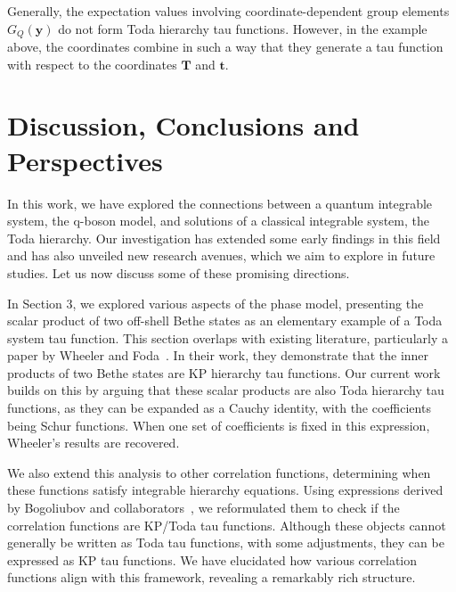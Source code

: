 \documentclass[a4paper,11pt]{amsart}
\begin{document}
Generally, the expectation values involving coordinate-dependent group
elements \(G_{Q}(\bm{y})\) do not form Toda hierarchy tau
functions. However, in the example above, the coordinates combine in
such a way that they generate a tau function with respect to the
coordinates \(\bm{T}\) and \(\bm{t}\).
 

\section{Discussion, Conclusions and Perspectives}


In this work, we have explored the connections between a quantum
integrable system, the q-boson model, and solutions of a classical
integrable system, the Toda hierarchy. Our investigation has extended
some early findings in this field and has also unveiled new research
avenues, which we aim to explore in future studies. Let us now discuss
some of these promising directions.

In Section 3, we explored various aspects of the phase model,
presenting the scalar product of two off-shell Bethe states as an
elementary example of a Toda system tau function. This section
overlaps with existing literature, particularly a paper by Wheeler and
Foda~\cite{Wheeler:2010vmq, Foda:2008hn}. In their work, they
demonstrate that the inner products of two Bethe states are KP
hierarchy tau functions. Our current work builds on this by arguing
that these scalar products are also Toda hierarchy tau functions, as
they can be expanded as a Cauchy identity, with the coefficients being
Schur functions. When one set of coefficients is fixed in this
expression, Wheeler's results are recovered.

We also extend this analysis to other correlation functions,
determining when these functions satisfy integrable hierarchy
equations. Using expressions derived by Bogoliubov and
collaborators~\cite{Bogoliubov:1997soj}, we reformulated them to check
if the correlation functions are KP/Toda tau functions. Although these
objects cannot generally be written as Toda tau functions, with some
adjustments, they can be expressed as KP tau functions.  We have
elucidated how various correlation functions align with this
framework, revealing a remarkably rich structure.
\end{document}
